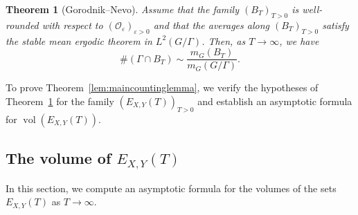 \documentclass[11pt,reqno]{amsart}
\newtheorem{thm}{Theorem}
\theoremstyle{definition}
\theoremstyle{remark}
\newcommand{\vol}{\operatorname{vol}}
\numberwithin{equation}{section}
\numberwithin{thm}{section}
\numberwithin{table}{section}
\begin{document}
\begin{thm}[Gorodnik--Nevo] \label{thm:gorodnik_nevo}
  Assume that the family $(B_T)_{T>0}$ is well-rounded with respect to  $(\mathcal{O}_\varepsilon)_{\varepsilon>0}$ and that the averages along $(B_T)_{T>0}$  satisfy the stable mean ergodic theorem in $L^2(G/\Gamma)$. Then, as $T \to \infty$, we have   
    \[
    \# (\Gamma \cap B_T) \sim \frac{m_G(B_T)}{m_G( G/\Gamma )}.
    \] 
\end{thm}

To prove Theorem~\ref{lem:maincountinglemma}, we verify the hypotheses of Theorem~\ref{thm:gorodnik_nevo} for the family $(E_{X,Y}(T))_{T>0}$ and establish an asymptotic formula for $\vol(E_{X,Y}(T))$.

\subsection{The volume of $E_{X,Y}(T)$} \label{section:volume}
   In this section, we compute an asymptotic formula for the volumes of the sets $E_{X,Y}(T)$ as $T \to \infty$. 
\end{document}

